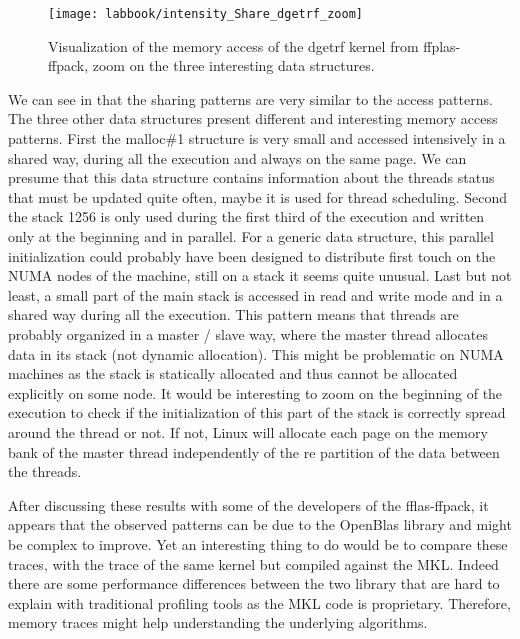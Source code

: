 \begin{figure}[htb]
    \centering
    \texttt{[image: labbook/intensity\_Share\_dgetrf\_zoom]}
    \caption{Visualization of the memory access of the dgetrf kernel from ffplas-ffpack, zoom on the three interesting data structures.}
    \label{fig:dgetrf-share-zoom}
\end{figure}

We can see in  that the sharing patterns are very similar to the access patterns.
The three other data structures present different and interesting memory access patterns.
First the malloc\#1 structure is very small and accessed intensively in a shared way, during all the execution and always on the same page.
We can presume that this data structure contains information about the threads status that must be updated quite often, maybe it is used for thread scheduling.
Second the stack 1256 is only used during the first third of the execution and written only at the beginning and in parallel.
For a generic data structure, this parallel initialization could probably have been designed to distribute first touch on the \gls{NUMA} nodes of the machine, still on a stack it seems quite unusual.
Last but not least, a small part of the main stack is accessed in read and write mode and in a shared way during all the execution.
This pattern means that threads are probably organized in a master / slave way, where the master thread allocates data in its stack (not dynamic allocation).
This might be problematic on \gls{NUMA} machines as the stack is statically allocated and thus cannot be allocated explicitly on some node.
It would be interesting to zoom on the beginning of the execution to check if the initialization of this part of the stack is correctly spread around the thread or not.
If not, Linux will allocate each page on the memory bank of the master thread independently of the re partition of the data between the threads.

After discussing these results with some of the developers of the fflas-ffpack, it appears that the observed patterns can be due to the OpenBlas library and might be complex to improve.
Yet an interesting thing to do would be to compare these traces, with the trace of the same kernel but compiled against the \gls{MKL}.
Indeed there are some performance differences between the two library that are hard to explain with traditional profiling tools as the \gls{MKL} code is proprietary.
Therefore, memory traces might help understanding the underlying algorithms.

